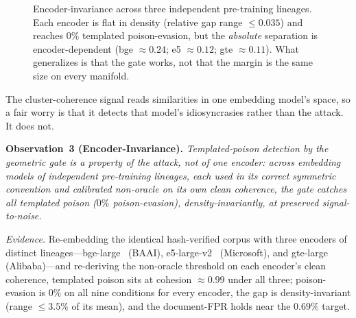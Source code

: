\documentclass[10pt,journal,compsoc]{IEEEtran}
\begin{document}
\begin{figure}[t]
\centering
{}
\caption{Encoder-invariance across three independent pre-training lineages. Each encoder is flat in density (relative gap range $\le 0.035$) and reaches $0\%$ templated poison-evasion, but the \emph{absolute} separation is encoder-dependent (bge $\approx 0.24$; e5 $\approx 0.12$; gte $\approx 0.11$). What generalizes is that the gate works, not that the margin is the same size on every manifold.}
\label{fig:encoder}
\end{figure}
The cluster-coherence signal reads similarities in one embedding model's space, so a
fair worry is that it detects that model's idiosyncrasies rather than the attack. It
does not.

\smallskip
\noindent\textbf{Observation~3 (Encoder-Invariance).}
\emph{Templated-poison detection by the geometric gate is a property of the attack,
not of one encoder: across embedding models of independent pre-training lineages, each
used in its correct symmetric convention and calibrated non-oracle on its own clean
coherence, the gate catches all templated poison ($0\%$ poison-evasion), density-invariantly, at
preserved signal-to-noise.}

\emph{Evidence.} Re-embedding the identical hash-verified corpus with three encoders of
distinct lineages---bge-large~\cite{bge} (BAAI), e5-large-v2~\cite{e5} (Microsoft), and
gte-large~\cite{gte} (Alibaba)---and re-deriving the non-oracle threshold on each
encoder's clean coherence, templated poison sits at cohesion $\approx 0.99$ under all
three; poison-evasion is $0\%$ on all nine conditions for every encoder, the gap is
density-invariant (range $\le 3.5\%$ of its mean), and the document-FPR holds near the
$0.69\%$ target.
\end{document}
